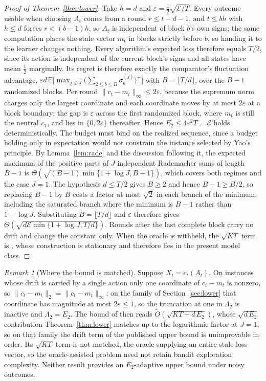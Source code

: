 \documentclass{article}
\theoremstyle{remark}
\newtheorem{remark}{Remark}
\newcommand{\Ex}{\mathbb{E}}
\newcommand{\Ot}{\widetilde{O}}
\newcommand{\etwo}{E_2}
\newcommand{\lamtwo}{\Lambda_2}
\begin{document}
\begin{proof}[Proof of Theorem~\ref{thm:lower}]
Take $h=d$ and $\varepsilon=\tfrac12\sqrt{\mathcal E/T}$. Every outcome usable when choosing $A_t$
comes from a round $r\le t-d-1$, and $t\le bh$ with $h\le d$ forces $r<(b-1)h$, so $A_t$ is
independent of block $b$'s own signs; the same computation places the stale vector $m_t$ in blocks
strictly before $b$, so handing it to the learner changes nothing. Every algorithm's
expected loss therefore equals $T/2$, since its action is independent of the current block's signs and all states have mean
$\tfrac12$ marginally. Its regret is therefore exactly the comparator's
fluctuation advantage,
$\varepsilon d\,\Ex\bigl[\max_{j\le J}\bigl(\sum_{2\le b\le B}\sigma_b^{(j)}\bigr)^{+}\bigr]$ with
$B=\lfloor T/d\rfloor$, over the $B-1$ randomized blocks. Per round $\|c_t-m_t\|_\infty\le2\varepsilon$, because the supremum norm charges only the largest
coordinate and each coordinate moves by at most $2\varepsilon$ at a block boundary; the gap is
$\varepsilon$ across the first randomized block, where $m_t$ is still the neutral $c_1$, and lies
in $\{0,2\varepsilon\}$ thereafter. Hence $\etwo\le4\varepsilon^2T=\mathcal E$ holds
deterministically. The
budget must bind on the realized sequence, since a budget holding only in expectation would not
constrain the instance selected by Yao's principle. By Lemma~\ref{lem:rade} and the discussion following it, the expected maximum of the positive
parts of $J$ independent Rademacher sums of length $B-1$ is
$\Theta(\sqrt{(B-1)\min\{1+\log J,B-1\}})$, which covers both regimes and the case $J=1$. The
hypothesis $d\le T/2$ gives $B\ge2$ and hence $B-1\ge B/2$, so replacing $B-1$ by $B$ costs a
factor at most $\sqrt2$ in each branch of the minimum, including the saturated branch where the
minimum is $B-1$ rather than $1+\log J$. Substituting $B=\lfloor T/d\rfloor$ and $\varepsilon$
therefore gives $\Theta(\sqrt{d\mathcal E\min\{1+\log J,T/d\}})$. Rounds after the last complete block
carry no drift and change the constant only. When the oracle is withheld, the $\sqrt{KT}$ term is \citet[Thm.~5.1]{esposito2023}, whose
construction is stationary and therefore lies in the present model class.
\end{proof}

\begin{remark}[Where the bound is matched]\label{rem:tight}
Suppose $X_t=c_t(A_t)$. On instances whose drift is carried by a single action only one coordinate
of $c_t-m_t$ is nonzero, so $\|c_t-m_t\|_2=\|c_t-m_t\|_\infty$; on the family of
Section~\ref{sec:lower} that coordinate has magnitude at most $2\varepsilon\le1$, so the truncation
at one in $\lamtwo$ is inactive and $\lamtwo=\etwo$. The bound of \citet{baron2025} then reads
$\Ot(\sqrt{KT+d\,\etwo})$, whose $\sqrt{d\,\etwo}$ contribution Theorem~\ref{thm:lower} matches up
to the logarithmic factor at $J=1$, so on that family the drift term of the published upper bound
is unimprovable in order. Its $\sqrt{KT}$ term is not matched, the oracle supplying an entire stale
loss vector, so the oracle-assisted problem need not retain bandit exploration complexity. Neither
result provides an $\etwo$-adaptive upper bound under noisy outcomes.
\end{remark}
\end{document}
